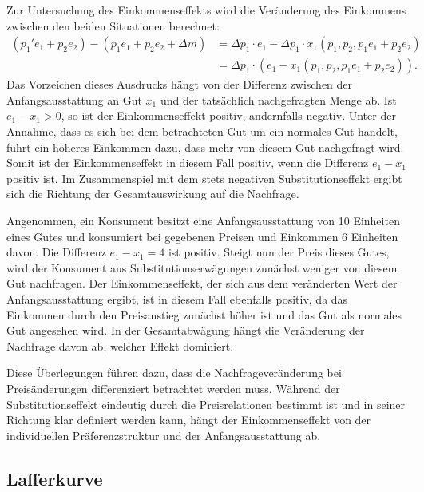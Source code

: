Zur Untersuchung des Einkommenseffekts wird die Veränderung des Einkommens zwischen den beiden Situationen berechnet:
\begin{align*}
	(p_1' e_1 + p_2 e_2) - (p_1 e_1 + p_2 e_2 + \Delta m)
	 & = \Delta p_1 \cdot e_1 - \Delta p_1 \cdot x_1(p_1, p_2, p_1 e_1 + p_2 e_2) \\
	 & = \Delta p_1 \cdot (e_1 - x_1(p_1, p_2, p_1 e_1 + p_2 e_2)).
\end{align*}
Das Vorzeichen dieses Ausdrucks hängt von der Differenz zwischen der Anfangsausstattung an Gut \(x_1\) und der tatsächlich nachgefragten Menge ab. Ist \(e_1 - x_1 > 0\), so ist der Einkommenseffekt positiv, andernfalls negativ.
Unter der Annahme, dass es sich bei dem betrachteten Gut um ein normales Gut handelt, führt ein höheres Einkommen dazu, dass mehr von diesem Gut nachgefragt wird. Somit ist der Einkommenseffekt in diesem Fall positiv, wenn die Differenz \(e_1 - x_1\) positiv ist. Im Zusammenspiel mit dem stets negativen Substitutionseffekt ergibt sich die Richtung der Gesamtauswirkung auf die Nachfrage.
\begin{example}
	Angenommen, ein Konsument besitzt eine Anfangsausstattung von 10 Einheiten eines Gutes und konsumiert bei gegebenen Preisen und Einkommen 6 Einheiten davon. Die Differenz \(e_1 - x_1 = 4\) ist positiv. Steigt nun der Preis dieses Gutes, wird der Konsument aus Substitutionserwägungen zunächst weniger von diesem Gut nachfragen. Der Einkommenseffekt, der sich aus dem veränderten Wert der Anfangsausstattung ergibt, ist in diesem Fall ebenfalls positiv, da das Einkommen durch den Preisanstieg zunächst höher ist und das Gut als normales Gut angesehen wird. In der Gesamtabwägung hängt die Veränderung der Nachfrage davon ab, welcher Effekt dominiert.
\end{example}
Diese Überlegungen führen dazu, dass die Nachfrageveränderung bei Preisänderungen differenziert betrachtet werden muss. Während der Substitutionseffekt eindeutig durch die Preisrelationen bestimmt ist und in seiner Richtung klar definiert werden kann, hängt der Einkommenseffekt von der individuellen Präferenzstruktur und der Anfangsausstattung ab.



\subsection{Lafferkurve}

